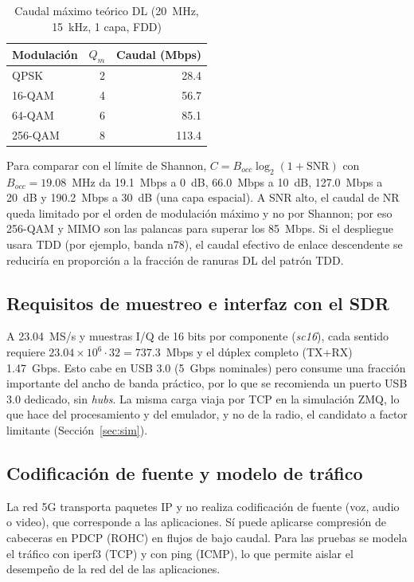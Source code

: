 \documentclass[conference]{IEEEtran}
\begin{document}
\begin{table}[!t]
\caption{Caudal máximo teórico DL (20~MHz, 15~kHz, 1 capa, FDD)}
\label{tab:thr}
\centering
\footnotesize
\renewcommand{\arraystretch}{1.15}
\begin{tabular}{lrr}
\toprule
\textbf{Modulación} & $Q_m$ & \textbf{Caudal (Mbps)} \\
\midrule
QPSK & 2 & 28.4 \\
16-QAM & 4 & 56.7 \\
64-QAM & 6 & 85.1 \\
256-QAM & 8 & 113.4 \\
\bottomrule
\end{tabular}
\end{table}

Para comparar con el límite de Shannon, $C=B_{occ}\log_2(1+\mathrm{SNR})$ con $B_{occ}=19.08$~MHz da 19.1~Mbps a 0~dB, 66.0~Mbps a 10~dB, 127.0~Mbps a 20~dB y 190.2~Mbps a 30~dB (una capa espacial). A SNR alto, el caudal de NR queda limitado por el orden de modulación máximo y no por Shannon; por eso 256-QAM y MIMO son las palancas para superar los 85~Mbps. Si el despliegue usara TDD (por ejemplo, banda n78), el caudal efectivo de enlace descendente se reduciría en proporción a la fracción de ranuras DL del patrón TDD.

\subsection{Requisitos de muestreo e interfaz con el SDR}
A 23.04~MS/s y muestras I/Q de 16 bits por componente (\textit{sc16}), cada sentido requiere $23.04\times10^6\cdot32=737.3$~Mbps y el dúplex completo (TX+RX) 1.47~Gbps. Esto cabe en USB 3.0 (5~Gbps nominales) pero consume una fracción importante del ancho de banda práctico, por lo que se recomienda un puerto USB 3.0 dedicado, sin \textit{hubs}. La misma carga viaja por TCP en la simulación ZMQ, lo que hace del procesamiento y del emulador, y no de la radio, el candidato a factor limitante (Sección~\ref{sec:sim}).

\subsection{Codificación de fuente y modelo de tráfico}
La red 5G transporta paquetes IP y no realiza codificación de fuente (voz, audio o video), que corresponde a las aplicaciones. Sí puede aplicarse compresión de cabeceras en PDCP (ROHC) en flujos de bajo caudal. Para las pruebas se modela el tráfico con iperf3 (TCP) y con ping (ICMP), lo que permite aislar el desempeño de la red del de las aplicaciones.
\end{document}
